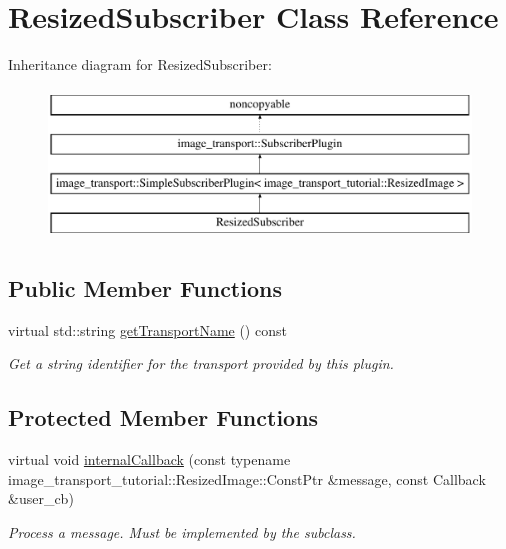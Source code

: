 \hypertarget{class_resized_subscriber}{\section{Resized\-Subscriber Class Reference}
\label{class_resized_subscriber}
}
Inheritance diagram for Resized\-Subscriber\-:\begin{figure}[H]
\begin{center}
\leavevmode
\includegraphics[height=4.000000cm]{class_resized_subscriber}
\end{center}
\end{figure}
\subsection*{Public Member Functions}
\begin{DoxyCompactItemize}
\item 
\hypertarget{class_resized_subscriber_abe804a1a73e5281d2e60f7ea6a82c9b8}{virtual std\-::string \hyperlink{class_resized_subscriber_abe804a1a73e5281d2e60f7ea6a82c9b8}{get\-Transport\-Name} () const }\label{class_resized_subscriber_abe804a1a73e5281d2e60f7ea6a82c9b8}

\begin{DoxyCompactList}\small\item\em Get a string identifier for the transport provided by this plugin. \end{DoxyCompactList}\end{DoxyCompactItemize}
\subsection*{Protected Member Functions}
\begin{DoxyCompactItemize}
\item 
virtual void \hyperlink{class_resized_subscriber_ad0a3debf9a2135bbbae6145cebb958e8}{internal\-Callback} (const typename image\-\_\-transport\-\_\-tutorial\-::\-Resized\-Image\-::\-Const\-Ptr \&message, const Callback \&user\-\_\-cb)
\begin{DoxyCompactList}\small\item\em Process a message. Must be implemented by the subclass. \end{DoxyCompactList}\end{DoxyCompactItemize}
